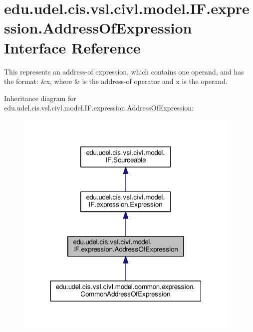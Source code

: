 \hypertarget{interfaceedu_1_1udel_1_1cis_1_1vsl_1_1civl_1_1model_1_1IF_1_1expression_1_1AddressOfExpression}{}\section{edu.\+udel.\+cis.\+vsl.\+civl.\+model.\+I\+F.\+expression.\+Address\+Of\+Expression Interface Reference}
\label{interfaceedu_1_1udel_1_1cis_1_1vsl_1_1civl_1_1model_1_1IF_1_1expression_1_1AddressOfExpression}


This represents an address-\/of expression, which contains one operand, and has the format\+: {\ttfamily \&x}, where {\ttfamily \&} is the address-\/of operator and {\ttfamily x} is the operand.  




Inheritance diagram for edu.\+udel.\+cis.\+vsl.\+civl.\+model.\+I\+F.\+expression.\+Address\+Of\+Expression\+:
\nopagebreak
\begin{figure}[H]
\begin{center}
\leavevmode
\includegraphics[width=306pt]{interfaceedu_1_1udel_1_1cis_1_1vsl_1_1civl_1_1model_1_1IF_1_1expression_1_1AddressOfExpression__inherit__graph}
\end{center}
\end{figure}


